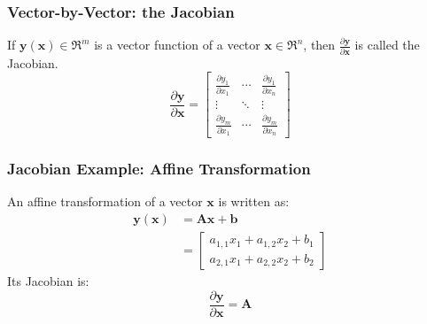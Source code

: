 \documentclass{beamer}
\begin{document}
\begin{frame}
  \frametitle{Vector-by-Vector: the Jacobian}

  If $\mathbf{y}(\mathbf{x})\in\Re^m$ is a vector function of a vector
  $\mathbf{x}\in\Re^n$, then
  $\frac{\partial\mathbf{y}}{\partial\mathbf{x}}$ is called the
  Jacobian.
  \begin{displaymath}
    \frac{\partial\mathbf{y}}{\partial\mathbf{x}}=
    \left[\begin{array}{ccc}
        \frac{\partial y_1}{\partial x_1} & \cdots & \frac{\partial y_1}{\partial x_n}\\
        \vdots&\ddots&\vdots\\
        \frac{\partial y_m}{\partial x_1} & \cdots & \frac{\partial y_m}{\partial x_n}
      \end{array}\right]
  \end{displaymath}
        
\end{frame}

\begin{frame}
  \frametitle{Jacobian Example: Affine Transformation}

  An affine transformation of a vector $\mathbf{x}$ is written as:
  \begin{align*}
    \mathbf{y}(\mathbf{x}) &= \mathbf{A}\mathbf{x}+\mathbf{b}\\
    &= \left[\begin{array}{c}
        a_{1,1}x_1+a_{1,2}x_2+b_1\\a_{2,1}x_1+a_{2,2}x_2+b_2
      \end{array}\right]
  \end{align*}
  Its Jacobian is:
  \begin{displaymath}
    \frac{\partial\mathbf{y}}{\partial\mathbf{x}}=\mathbf{A}
  \end{displaymath}
\end{frame}
\end{document}
